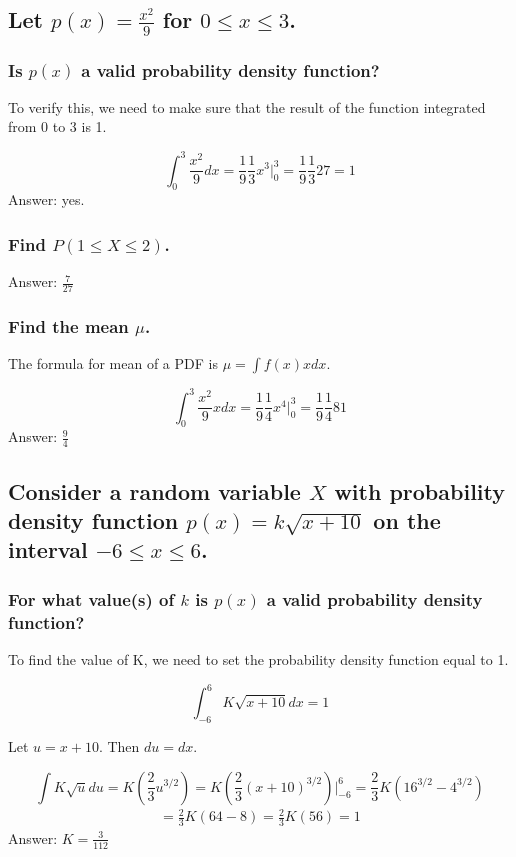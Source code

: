 \documentclass{article}
\begin{document}
\subsection{Let $p(x) = \frac{x^2}{9}$ for $0 \leq x \leq 3$.}

\subsubsection{Is $p(x)$ a valid probability density function?}

To verify this, we need to make sure that the result of the function integrated from 0 to 3 is 1. 

\[ \int_{0}^{3} \frac{x^2}{9} dx = \frac{1}{9}\frac{1}{3} x^3 \Big|_0^3 =\frac{1}{9}\frac{1}{3}27 = 1  \]
Answer: yes. 

\subsubsection{Find $P(1 \leq X \leq 2)$.}


Answer: $\frac{7}{27}$
\subsubsection{Find the mean $\mu$.}

The formula for mean of a PDF is $\mu = \int{f(x) x dx}$. 

\[ \int_{0}^{3} \frac{x^2}{9} x dx = \frac{1}{9}\frac{1}{4} x^4 \Big|_0^3 =\frac{1}{9}\frac{1}{4}81  \]
Answer: $\frac{9}{4}$

\subsection{Consider a random variable $X$ with probability density function $p(x) = k\sqrt{x + 10}$ on the interval $-6 \leq x \leq 6$.}

\subsubsection{For what value(s) of $k$ is $p(x)$ a valid probability density function?}

To find the value of K, we need to set the probability density function equal to 1. 

\[\int_{-6}^{6} K \sqrt{x+10} dx  = 1\]

Let $u = x+10$. Then $du = dx$. 

\[\int K \sqrt{u} du  = K (\frac{2}{3} u^{3/2}) =K (\frac{2}{3} (x+10)^{3/2}) \Big|_{-6}^6 = \frac{2}{3}K(16^{3/2} - 4^ {3/2})  \]
\begin{align*}
	= \frac{2}{3}K(64-8) = \frac{2}{3}K(56) = 1
\end{align*}
Answer: $K = \frac{3}{112}$
\end{document}

